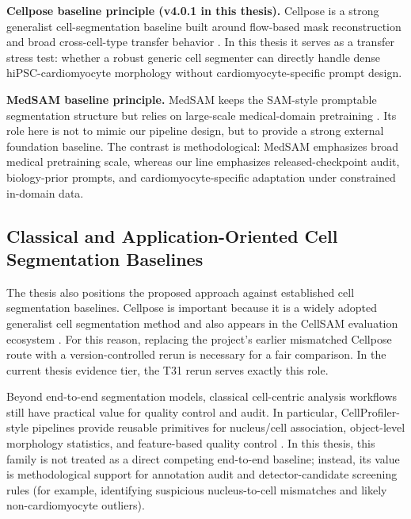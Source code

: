 \textbf{Cellpose baseline principle (v4.0.1 in this thesis).}
Cellpose is a strong generalist cell-segmentation baseline built around flow-based mask reconstruction and broad cross-cell-type transfer behavior \cite{stringer2021cellpose}. In this thesis it serves as a transfer stress test: whether a robust generic cell segmenter can directly handle dense hiPSC-cardiomyocyte morphology without cardiomyocyte-specific prompt design.

\textbf{MedSAM baseline principle.}
MedSAM keeps the SAM-style promptable segmentation structure but relies on large-scale medical-domain pretraining \cite{ma2024medsam}. Its role here is not to mimic our pipeline design, but to provide a strong external foundation baseline. The contrast is methodological: MedSAM emphasizes broad medical pretraining scale, whereas our line emphasizes released-checkpoint audit, biology-prior prompts, and cardiomyocyte-specific adaptation under constrained in-domain data.

\subsection{Classical and Application-Oriented Cell Segmentation Baselines}\label{classical-and-application-oriented-cell-segmentation-baselines}

The thesis also positions the proposed approach against established cell segmentation baselines. Cellpose is important because it is a widely adopted generalist cell segmentation method and also appears in the CellSAM evaluation ecosystem \cite{stringer2021cellpose}. For this reason, replacing the project's earlier mismatched Cellpose route with a version-controlled rerun is necessary for a fair comparison. In the current thesis evidence tier, the T31 rerun serves exactly this role.

Beyond end-to-end segmentation models, classical cell-centric analysis workflows still have practical value for quality control and audit. In particular, CellProfiler-style pipelines provide reusable primitives for nucleus/cell association, object-level morphology statistics, and feature-based quality control \cite{carpenter2006cellprofiler,mcquin2018cellprofiler3}. In this thesis, this family is not treated as a direct competing end-to-end baseline; instead, its value is methodological support for annotation audit and detector-candidate screening rules (for example, identifying suspicious nucleus-to-cell mismatches and likely non-cardiomyocyte outliers).

